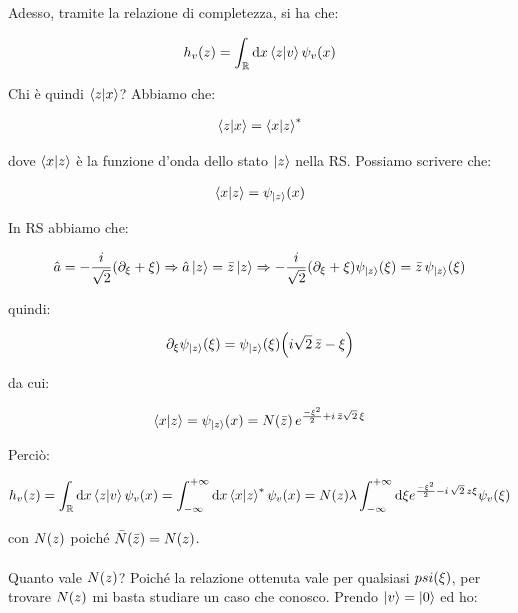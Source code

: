 	Adesso, tramite la relazione di completezza, si ha che:
	
\begin{align*}
	h_v\qty(z) = \int_{\mathbb{R}} \dd x \braket{z}{v} \psi_v\qty(x)
\end{align*}
	
	Chi è quindi $\braket{z}{x}$? Abbiamo che:
	
\begin{align*}
	\braket{z}{x} = \braket{x}{z}^*
\end{align*}

	dove $\braket{x}{z}$ è la funzione d'onda dello stato $\ket{z}$ nella RS. Possiamo scrivere che:
	
\begin{align*}
	\braket{x}{z} = \psi_{\ket{z}} \qty(x)
\end{align*}
	
	In RS abbiamo che:

\begin{align*}
	\hat{a} = - \frac{i}{\sqrt{2}} \qty(\partial_{\xi} + \xi) \Rightarrow \hat{a} \ket{z} = \bar{z} \ket{z} \Rightarrow  - \frac{i}{\sqrt{2}} \qty(\partial_{\xi} + \xi) \psi_{\ket{z}} \qty(\xi) = \bar{z} \, \psi_{\ket{z}} \qty(\xi)
\end{align*}

	quindi:
	
\begin{align*}
	\partial_{\xi} \psi_{\ket{z}} \qty(\xi) = \psi_{\ket{z}} \qty(\xi) \qty(i \sqrt{2} \, \bar{z} - \xi)
\end{align*}

	da cui:
	
\begin{align*}
	\braket{x}{z} = \psi_{\ket{z}}\qty(x) = N  \qty(\bar{z}) \, e^{\frac{-\xi^2}{2} + i \, \bar{z} \sqrt{2} \, \xi}
\end{align*}

	Perciò:
	
\begin{align*}
	h_v\qty(z) = \int_{\mathbb{R}} \dd x \braket{z}{v} \psi_v\qty(x) = 	\int_{- \infty}^{+ \infty} \dd x \braket{x}{z}^* \psi_v\qty(x) = N \qty(z) \lambda \int_{- \infty}^{+ \infty} \dd \xi e^{\frac{- \xi^2}{2} - i \, \sqrt{2} \, z \xi} \psi_v\qty(\xi)
\end{align*}

	con $N\qty(z)$ poiché $\bar{N}\qty(\bar{z}) = N\qty(z)$.
	\\
	\\
	Quanto vale $N\qty(z)$? Poiché la relazione ottenuta vale per qualsiasi $psi\qty(\xi)$, per trovare $N\qty(z)$ mi basta studiare un caso che conosco. Prendo $\ket{v} = \ket{0}$ ed ho:

